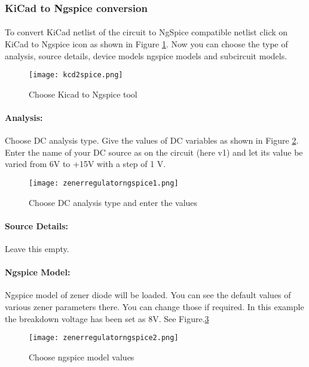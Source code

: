 \subsubsection{KiCad to Ngspice conversion}

\paragraph{} To convert KiCad netlist of the circuit to NgSpice
compatible netlist click on KiCad to Ngspice icon as shown in Figure \ref{kcd2spice}.  Now you can choose the type of analysis, source details, device models ngspice models and subcircuit models.


\begin{figure}[H]
\centering
\texttt{[image: kcd2spice.png]}
\caption{Choose Kicad to Ngspice tool}
\label{kcd2spice}
\end{figure}


\paragraph{Analysis:}Choose DC analysis type. Give the values of DC variables as shown in Figure \ref{zenerregulatorngspice1}. Enter the name of your DC source as on the circuit (here v1) and let its value be varied from 6V to +15V with a step of 1 V.

\begin{figure}[H]
\centering
\texttt{[image: zenerregulatorngspice1.png]}
\caption{Choose DC analysis type and enter the values}
\label{zenerregulatorngspice1}
\end{figure}

\paragraph{Source Details:} Leave this empty.

\paragraph{Ngspice Model:} Ngspice model of zener diode will be loaded. You can see the default values of various zener parameters there. You can change those if required. In this example the breakdown voltage has been set as 8V. See Figure.\ref{zenerregulatorngspice2}
\begin{figure}[H]
\centering
\texttt{[image: zenerregulatorngspice2.png]}
\caption{Choose ngspice model values}
\label{zenerregulatorngspice2}
\end{figure}

